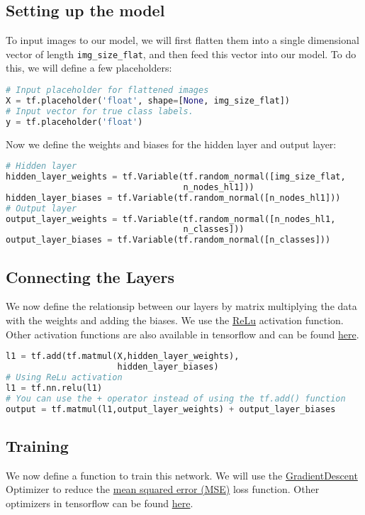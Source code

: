 \documentclass[Proceedings]{ascelike}
\begin{document}
\subsection{Setting up the model}
To input images to our model, we will first flatten them into a single dimensional vector of length \texttt{img\_size\_flat}, and then feed this vector into our model. To do this, we will define a few placeholders:

\begin{lstlisting}[language=Python]
# Input placeholder for flattened images
X = tf.placeholder('float', shape=[None, img_size_flat])
# Input vector for true class labels.
y = tf.placeholder('float')
\end{lstlisting}

Now we define the weights and biases for the hidden layer and output layer:

\begin{lstlisting}[language=Python]
# Hidden layer
hidden_layer_weights = tf.Variable(tf.random_normal([img_size_flat, 
                                   n_nodes_hl1]))
hidden_layer_biases = tf.Variable(tf.random_normal([n_nodes_hl1]))
# Output layer
output_layer_weights = tf.Variable(tf.random_normal([n_nodes_hl1,
                                   n_classes]))
output_layer_biases = tf.Variable(tf.random_normal([n_classes]))
\end{lstlisting}

\subsection{Connecting the Layers}
We now define the relationsip between our layers by matrix multiplying the data with the weights and adding the biases. We use the \href{https://en.wikipedia.org/wiki/Rectifier_(neural_networks)}{ReLu} activation function. Other activation functions are also available in tensorflow and can be found \href{https://www.tensorflow.org/api_guides/python/nn}{here}.

\begin{lstlisting}[language=Python]
l1 = tf.add(tf.matmul(X,hidden_layer_weights), 
                      hidden_layer_biases)
# Using ReLu activation
l1 = tf.nn.relu(l1)
# You can use the + operator instead of using the tf.add() function
output = tf.matmul(l1,output_layer_weights) + output_layer_biases
\end{lstlisting}

\subsection{Training}
We now define a function to train this network. We will use the \href{https://en.wikipedia.org/wiki/Gradient_descent}{GradientDescent} Optimizer to reduce the \href{https://en.wikipedia.org/wiki/Mean_squared_error}{mean squared error (MSE)} loss function. Other optimizers in tensorflow can be found \href{https://www.tensorflow.org/api_guides/python/train#Optimizers}{here}.
\end{document}
